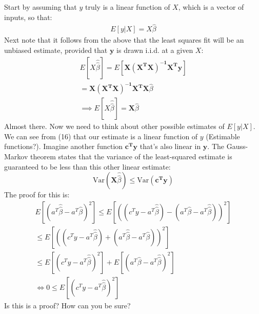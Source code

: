\documentclass[11pt,a4paper,article]{memoir} %
\begin{document}
Start by assuming that $y$ truly is a linear function of $X$, which is a vector of inputs, so that:
\begin{gather}
	E[y|X] = X\hat{\beta} 
\end{gather}
Next note that it follows from the above that the least squares fit will be an unbiased estimate, provided that $\boldsymbol{y}$ is drawn i.i.d. at a given $X$:
\begin{gather}
	E[X\hat{\hat{\beta}}] = E[\boldsymbol{X(X^T X)^{-1}X^T y}] \\
	= \boldsymbol{X(X^T X)^{-1}X^T X}\hat{\beta} \\
	\implies E[X\hat{\hat{\beta}}] = \boldsymbol{X}\hat{\beta}
\end{gather}
Almost there. Now we need to think about other possible estimates of $E[y|X]$. We can see from (16) that our estimate is a linear function of $y$ (Estimable functions?). Imagine another function $\boldsymbol{c^T y}$ that's also linear in $\boldsymbol{y}$. The Gauss-Markov theorem states that the variance of the least-squared estimate is guaranteed to be less than this other linear estimate:
\begin{equation}
	\text{Var}(\boldsymbol{X}\hat{\hat{\beta}}) \leq \text{Var}(\boldsymbol{c^Ty})
\end{equation} 
The proof for this is:
\begin{gather}
	E[(a^T \hat{\hat{\beta}} - a^T \hat{\beta})^2] \leq E[((c^T y - a^T \hat{\hat{\beta}}) - ( a^T \hat{\beta} - a^T \hat{\hat{\beta}}))^2]\\
	\leq  E[((c^T y - a^T \hat{\hat{\beta}}) + ( a^T \hat{\hat{\beta}} - a^T \hat{\beta}))^2] \\
	\leq E[(c^T y - a^T \hat{\hat{\beta}})^2] + E[( a^T \hat{\beta} - a^T \hat{\hat{\beta}})^2] \\
	\iff 0 \leq E[(c^T y - a^T \hat{\hat{\beta}})^2]
\end{gather}
Is this is a proof? How can you be sure?
\end{document}
